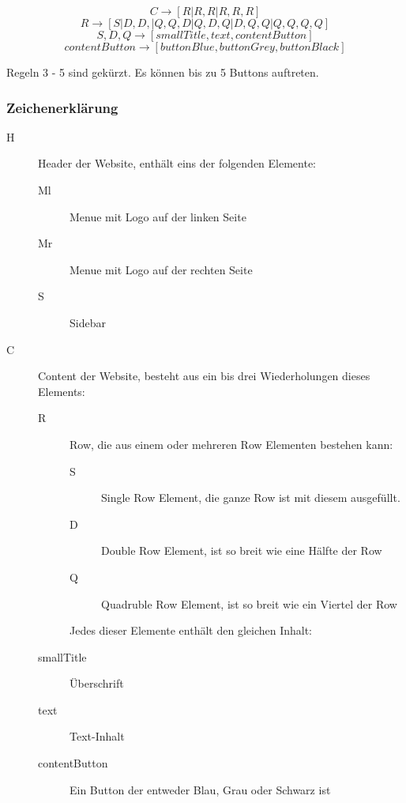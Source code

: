 \documentclass[pdftex,a4paper,halfparskip]{scrartcl}
\begin{document}
\begin{equation}
C \rightarrow [R | R, R | R, R, R ]
\end{equation}
\begin{equation}
R \rightarrow [S | D, D, | Q, Q, D | Q, D, Q | D, Q, Q | Q, Q, Q, Q]
\end{equation}
\begin{equation}
S, D, Q \rightarrow [smallTitle, text, contentButton]
\end{equation}
\begin{equation}
contentButton \rightarrow [buttonBlue, buttonGrey, buttonBlack]
\end{equation}

Regeln 3 - 5 sind gekürzt. Es können bis zu 5 Buttons auftreten.

\subsubsection{Zeichenerklärung}

\begin{description}
	\item[H] Header der Website, enthält eins der folgenden Elemente: 
	\begin{description}
		\item[Ml] Menue mit Logo auf der linken Seite
		\item[Mr] Menue mit Logo auf der rechten Seite
		\item[S] Sidebar	
	\end{description}
	\item[C] Content der Website, besteht aus ein bis drei Wiederholungen dieses Elements:
	\begin{description}
		\item[R] Row, die aus einem oder mehreren Row Elementen bestehen kann:
		\begin{description}
			\item[S] Single Row Element, die ganze Row ist mit diesem ausgefüllt.
			\item[D] Double Row Element, ist so breit wie eine Hälfte der Row
			\item[Q] Quadruble Row Element, ist so breit wie ein Viertel der Row
		\end{description}
		Jedes dieser Elemente enthält den gleichen Inhalt:
		\item[smallTitle] Überschrift
		\item[text] Text-Inhalt
		\item[contentButton] Ein Button der entweder Blau, Grau oder Schwarz ist 
	\end{description}
\end{description}
\end{document}

